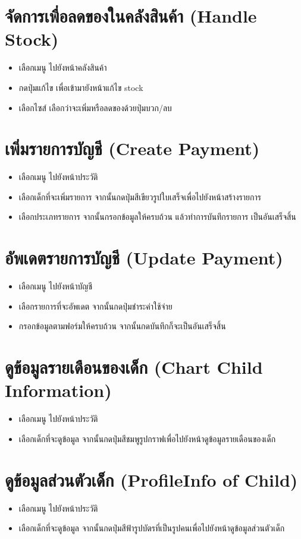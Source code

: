 \section{จัดการเพื่อลดของในคลังสินค้า (Handle Stock)}
\begin{itemize}
    \item เลือกเมนู ไปยังหน้าคลังสินค้า
    \item กดปุ่มแก้ไข เพื่อเข้ามายังหน้าแก้ไข stock
    \item เลือกไซส์ เลือกว่าจะเพิ่มหรือลดของด้วยปุ่มบวก/ลบ
\end{itemize}

\section{เพิ่มรายการบัญชี (Create Payment)}
\begin{itemize}
    \item เลือกเมนู ไปยังหน้าประวัติ
    \item เลือกเด็กที่จะเพิ่มรายการ จากนั้นกดปุ่มสีเขียวรูปใบเสร็จเพื่อไปยังหน้าสร้างรายการ
    \item เลือกประเภทรายการ จากนั้นกรอกข้อมูลให้ครบถ้วน แล้วทำการบันทึกรายการ เป็นอันเสร็จสิ้น
\end{itemize}

\section{อัพเดตรายการบัญชี (Update Payment)}
\begin{itemize}
    \item เลือกเมนู ไปยังหน้าบัญชี
    \item เลือกรายการที่จะอัพเดต จากนั้นกดปุ่มชำระค่าใช้จ่าย
    \item กรอกข้อมูลตามฟอร์มให้ครบถ้วน จากนั้นกดบันทึกก็จะเป็นอันเสร็จสิ้น
\end{itemize}

\section{ดูข้อมูลรายเดือนของเด็ก (Chart Child Information)}
\begin{itemize}
    \item เลือกเมนู ไปยังหน้าประวัติ
    \item เลือกเด็กที่จะดูข้อมูล จากนั้นกดปุ่มสีชมพูรูปกราฟเพื่อไปยังหน้าดูข้อมูลรายเดือนของเด็ก
\end{itemize}
\section{ดูข้อมูลส่วนตัวเด็ก (ProfileInfo of Child)}
\begin{itemize}
    \item เลือกเมนู ไปยังหน้าประวัติ
    \item เลือกเด็กที่จะดูข้อมูล จากนั้นกดปุ่มสีฟ้ารูปบัตรที่เป็นรูปคนเพื่อไปยังหน้าดูข้อมูลส่วนตัวเด็ก
\end{itemize}

